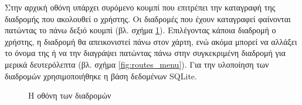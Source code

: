 \documentclass{assignment}
\begin{document}
Στην αρχική οθόνη υπάρχει συρόμενο κουμπί που επιτρέπει την καταγραφή της διαδρομής που ακολουθεί ο χρήστης. Οι διαδρομές που έχουν καταγραφεί φαίνονται πατώντας το πάνω δεξιό κουμπί (βλ. σχήμα \ref{fig:routes}). Επιλέγοντας κάποια διαδρομή ο χρήστης, η διαδρομή θα απεικονιστεί πάνω στον χάρτη, ενώ ακόμα μπορεί να αλλάξει το όνομα της ή να την διαγράψει πατώντας πάνω στην συγκεκριμένη διαδρομή για μερικά δευτερόλεπτα (βλ. σχήμα \ref{fig:routes_menu}). Για την υλοποίηση των διαδρομών χρησιμοποιήθηκε η βάση δεδομένων SQLite.

\begin{figure}
\begin{center}
\caption{Η οθόνη των διαδρομών}
\label{fig:routes}
\end{center}
\end{figure}
\end{document}
